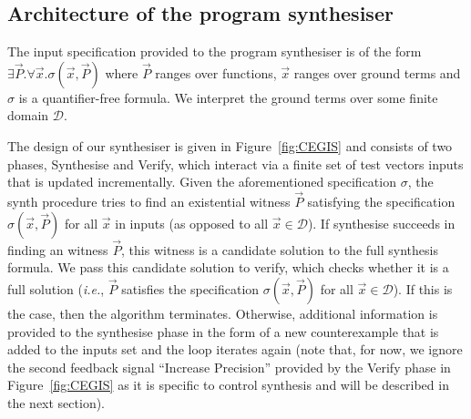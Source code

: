 \documentclass{sig-alternate-05-2015}
\newcommand{\red}[1]{{\color{red}#1}}
\begin{document}


\subsection{Architecture of the program synthesiser}
\label{synthesiser-general}
%
% 
The input specification provided to the program synthesiser is of the form
$\exists \vec{P} .  \forall \vec{x}.  \sigma(\vec{x}, \vec{P})$ where
$\vec{P}$ ranges over functions, $\vec{x}$ ranges over ground terms and
$\sigma$ is a quantifier-free formula.  We interpret the ground terms over
some finite domain $\mathcal{D}$.

The design of our synthesiser is given in Figure~\ref{fig:CEGIS} and consists
of two phases, {\sc Synthesise} and {\sc Verify}, which interact via a
finite set of test vectors {\sc inputs} that is updated incrementally. 
Given the aforementioned specification $\sigma$, the {\sc synth} procedure
tries to find an existential witness $\vec{P}$ satisfying the specification
$\sigma(\vec{x}, \vec{P})$ for all $\vec{x}$ in {\sc inputs} (as opposed to
all $\vec{x} \in \mathcal{D}$).
%
If {\sc synthesise} succeeds in finding an witness $\vec{P}$, this witness
is a candidate solution to the full synthesis formula.  We pass this
candidate solution to {\sc verify}, which checks whether it is a full
solution ({\it i.e.}, $\vec{P}$ satisfies the specification $\sigma(\vec{x},
\vec{P})$ for all $\vec{x}\in\mathcal{D}$).
%
%
%
If this is the case, then the algorithm terminates.  Otherwise, additional
information is provided to the {\sc synthesise} phase in the form of a new
counterexample that is added to the {\sc inputs} set and the loop iterates
again (note that, for now, we ignore the second feedback signal ``Increase
Precision'' provided by the {\sc Verify} phase in Figure~\ref{fig:CEGIS} as it
is specific to control synthesis and will be described in the next section).
\end{document}
